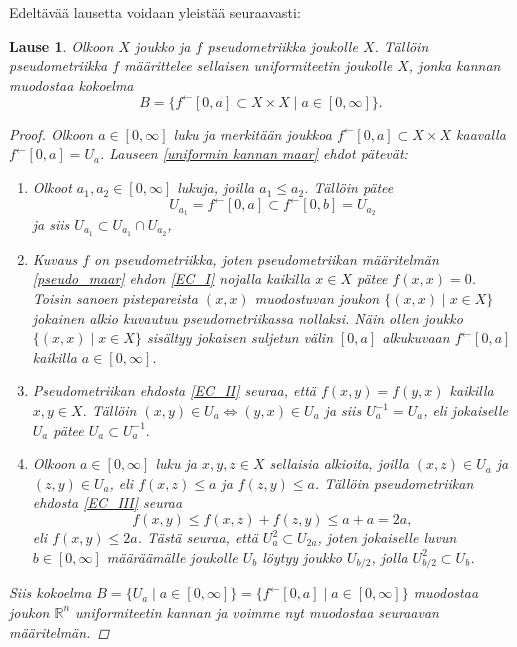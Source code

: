 \documentclass[12pt,a4paper,leqno]{report}
\newcommand{\R}{\mathbb{R}}
\theoremstyle{plain}
\newtheorem{lause}[equation]{Lause}
\theoremstyle{definition}
\theoremstyle{remark}
\begin{document}
\noindent Edeltävää lausetta voidaan yleistää seuraavasti: 
\begin{lause}\label{pseudo_uniformi_maar}
Olkoon $X$ joukko ja $f$ pseudometriikka joukolle $X$. Tällöin pseudometriikka $f$ määrittelee sellaisen uniformiteetin joukolle $X$, jonka kannan muodostaa kokoelma $$B=\{ f^{\leftarrow}[0,a]\subset X\times X\mid a\in[0,\infty]\}.$$
\begin{proof}
Olkoon $a\in[0,\infty]$ luku ja merkitään 
joukkoa $f^{\leftarrow}[0,a]\subset X\times X$ kaavalla $f^{\leftarrow}[0,a]=U_a$. 
Lauseen \ref{uniformin kannan maar} ehdot pätevät:
\begin{enumerate} [label=(B\arabic*)]
\item %
Olkoot $a_1,a_2\in[0,\infty]$ lukuja, joilla $a_1\leq a_2$. 
Tällöin pätee $$U_{a_1}=f^{\leftarrow}[0,a]\subset f^{\leftarrow}[0,b]=U_{a_2}$$ ja siis $U_{a_1}\subset U_{a_1}\cap U_{a_2}$,
\item%
Kuvaus $f$ on pseudometriikka, joten pseudometriikan määritelmän \ref{pseudo_maar} ehdon \ref{EC_I} nojalla kaikilla $x\in X$ pätee $f(x,x)=0$. 
Toisin sanoen pistepareista $(x,x)$ muodostuvan joukon $\{(x,x)\mid x\in X\}$ jokainen alkio kuvautuu pseudometriikassa nollaksi. Näin ollen joukko $\{(x,x)\mid x\in X\}$ sisältyy jokaisen suljetun välin $[0,a]$ alkukuvaan $f^{\leftarrow}[0,a]$ kaikilla $a\in [0,\infty]$.
\item%
Pseudometriikan ehdosta \ref{EC_II} seuraa, että $f(x,y)=f(y,x)$ kaikilla $x,y\in X$. 
Tällöin $(x,y)\in U_a\Leftrightarrow (y,x)\in U_a$ ja siis $U_a^{-1}=U_a$, eli jokaiselle $U_a$ pätee $U_a\subset U_a^{-1}. $
\item%
Olkoon $a\in[0,\infty]$ luku ja $x,y,z\in X$ sellaisia alkioita, joilla $(x,z)\in U_a$ ja $(z,y)\in U_a$, eli $f(x,z)\leq a$ ja $f(z,y)\leq a$.
Tällöin pseudometriikan ehdosta \ref{EC_III} seuraa 
$$f(x,y)\leq f(x,z)+f(z,y)\leq a+a=2a,$$ 
eli $f(x,y)\leq 2a$. Tästä seuraa, että $U_a^2\subset U_{2a} $, joten jokaiselle luvun $b\in[0,\infty]$ määräämälle joukolle $U_b$ löytyy joukko $U_{b/2}$, jolla $U_{b/2}^2\subset U_b$.
\end{enumerate}
Siis kokoelma $B=\{U_a\mid a\in[0,\infty]\}
=\{f^{\leftarrow}[0,a]\mid a\in[0,\infty]\}
$ muodostaa joukon $\R^n$ uniformiteetin kannan ja voimme nyt muodostaa seuraavan määritelmän.
\end{proof}
\end{lause}
\end{document}
